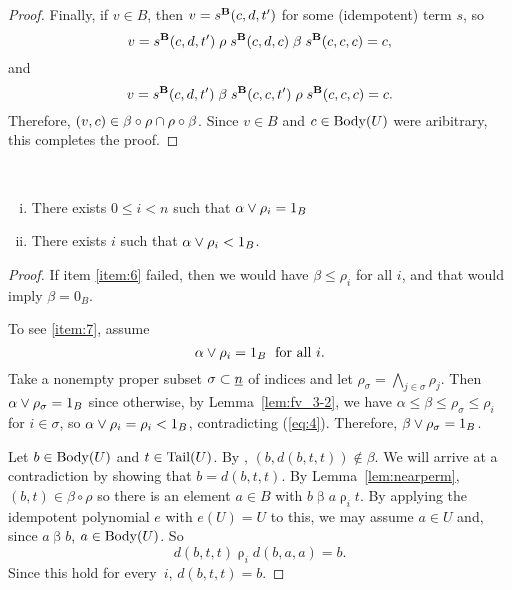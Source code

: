\begin{proof}
Finally, if $v \in B$, then $v = s^{\mathbf{B}}(c,d,t')$ for 
some (idempotent) term $s$, so
\[
v = s^{\mathbf{B}}(c,d,t')
\mathrel{\rho} s^{\mathbf{B}}(c,d,c)
\mathrel{\beta} s^{\mathbf{B}}(c,c,c) = c,
\]
and
\[
v = s^{\mathbf{B}}(c,d,t')
\mathrel{\beta}  s^{\mathbf{B}}(c,c,t')
\mathrel{\rho}s^{\mathbf{B}}(c,c,c)  = c.
\]
Therefore, 
$(v,c) \in  \beta \circ \rho \cap \rho \circ \beta$.
Since $v \in B$ and $c\in \operatorname{Body}(U)$ were aribitrary,
this completes the proof.
\end{proof}



\begin{lemma}\
  \label{lem:fv_3-3}
  \begin{enumerate}[(i)]
    \item \label{item:6} There exists $0\leq i< n $
      such that $\alpha \join \rho_i = 1_B$
    \item \label{item:7} There exists $i$ such that  
      $\alpha \join \rho_i < 1_B$.
  \end{enumerate}
\end{lemma}
\begin{proof}
If item \eqref{item:6} failed, then we would 
have $\beta \leq \rho_i$ for all $i$, and that
would imply $\beta = 0_B$.
  
To see \eqref{item:7}, assume
\begin{equation} \label{eq:4}
\alpha \join \rho_i = 1_B \; \text{ for all $i$.}
\end{equation}
Take a nonempty proper subset $\sigma \subset \underline{n}$ of indices and let 
$\rho_\sigma = \bigwedge_{j\in \sigma} \rho_j$.
Then $\alpha \join \rho_\sigma = 1_B$ since otherwise,
by Lemma~\ref{lem:fv_3-2}, we have
$\alpha \leq \beta \leq \rho_\sigma \leq \rho_i$ for $i \in \sigma$, so
$\alpha \join \rho_i = \rho_i < 1_B$, contradicting (\ref{eq:4}).
Therefore, $\beta \join \rho_\sigma = 1_B$.




Let $b \in \operatorname{Body}(U)$ and $t \in \operatorname{Tail}(U)$. By
\cite[Lemma~4.25]{HM:1988}, $(b, d(b,t,t)) \notin \beta$.
We will arrive at a contradiction by showing that 
$b = d(b,t,t)$. By Lemma~\ref{lem:nearperm}, 
$(b,t) \in \beta \circ \rho$ so
there is an element $a \in B$ with 
$b\mathrel\beta a \mathrel\rho_i t$. By applying the idempotent
polynomial $e$ with $e(U) = U$ to this, we may assume $a \in U$
and, since $a\mathrel \beta b$, $a \in \operatorname{Body}(U)$. So
\[
d(b,t,t) \mathrel\rho_i d(b,a,a) = b.
\]
Since this hold for every~$i$, $d(b,t,t) = b$.
\end{proof}


